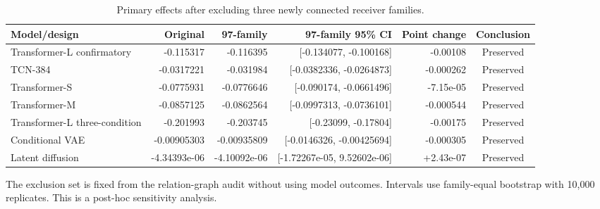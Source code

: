 \begin{table}[t]
\caption{Primary effects after excluding three newly connected receiver families.}
\label{tab:shadow-sensitivity}
\centering
\scriptsize
\begin{tabular}{lrrrrc}
\toprule
Model/design & Original & 97-family & 97-family 95\% CI & Point change & Conclusion \\
\midrule
Transformer-L confirmatory & -0.115317 & -0.116395 & [-0.134077, -0.100168] & -0.00108 & Preserved \\
TCN-384 & -0.0317221 & -0.031984 & [-0.0382336, -0.0264873] & -0.000262 & Preserved \\
Transformer-S & -0.0775931 & -0.0776646 & [-0.090174, -0.0661496] & -7.15e-05 & Preserved \\
Transformer-M & -0.0857125 & -0.0862564 & [-0.0997313, -0.0736101] & -0.000544 & Preserved \\
Transformer-L three-condition & -0.201993 & -0.203745 & [-0.23099, -0.17804] & -0.00175 & Preserved \\
Conditional VAE & -0.00905303 & -0.00935809 & [-0.0146326, -0.00425694] & -0.000305 & Preserved \\
Latent diffusion & -4.34393e-06 & -4.10092e-06 & [-1.72267e-05, 9.52602e-06] & +2.43e-07 & Preserved \\
\bottomrule
\end{tabular}
\vspace{2pt}
\begin{minipage}{\textwidth}
\footnotesize The exclusion set is fixed from the relation-graph audit without using model outcomes. Intervals use family-equal bootstrap with 10,000 replicates. This is a post-hoc sensitivity analysis.
\end{minipage}
\end{table}
